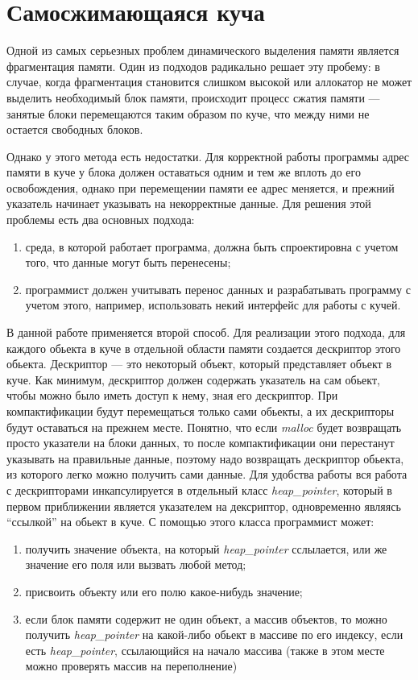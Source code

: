 \section{Самосжимающаяся куча}
Одной из самых серьезных проблем динамического выделения памяти
является фрагментация памяти. Один из подходов
радикально решает эту пробему: в случае,
когда фрагментация становится слишком высокой или аллокатор не может выделить 
необходимый блок памяти, происходит процесс сжатия
памяти --- занятые блоки перемещаются таким образом по куче, что между ними не 
остается свободных блоков.

Однако у этого метода есть недостатки. Для корректной работы программы адрес памяти
в куче у блока должен оставаться
одним и тем же вплоть до его освобождения, однако при перемещении памяти ее адрес
меняется, и прежний указатель начинает указывать на некорректные данные. 
Для решения этой проблемы есть два основных подхода:
\begin{enumerate}
\item 
	среда, в которой работает программа, должна быть спроектировна с учетом того,
    что данные могут быть перенесены;
\item 
	программист должен учитывать перенос данных и разрабатывать программу с учетом
    этого, например, использовать некий интерфейс для работы с кучей.
\end{enumerate}
В данной работе применяется второй способ. Для реализации этого подхода, для каждого 
обьекта в куче в отдельной области памяти создается дескриптор этого обьекта. Дескриптор --- 
это некоторый объект, который представляет объект в куче. Как минимум, дескриптор должен 
содержать указатель на сам обьект, чтобы можно было иметь доступ к нему, зная его дескриптор.
При компактификации будут перемещаться только сами обьекты, а их дескрипторы будут 
оставаться на прежнем месте. Понятно, что если \textit{malloc} будет возвращать 
просто указатели на блоки данных, то после компактификации они перестанут указывать
на правильные данные, поэтому надо возвращать дескриптор  обьекта, из которого легко
можно получить сами данные. Для удобства работы вся работа с дескрипторами инкапсулируется
в отдельный класс \textit{heap\_pointer}, который в первом приближении является указателем
на дексриптор, одновременно являясь ``ссылкой'' на обьект в куче. С помощью этого 
класса программист может:
\begin{enumerate}
\item
получить значение объекта, на который \textit{heap\_pointer} сслылается, или же значение
его поля или вызвать любой метод;
\item
присвоить объекту или его полю какое-нибудь значение; 
\item
если блок памяти содержит не один объект, а массив объектов, то можно получить
\textit{heap\_pointer} на какой-либо обьект в массиве по его индексу, если есть 
\textit{heap\_pointer}, ссылающийся на начало массива (также в этом месте можно 
проверять массив на переполнение)
\end{enumerate}  

